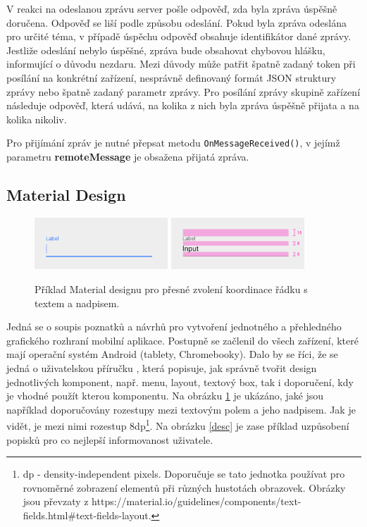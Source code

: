 V reakci na odeslanou zprávu server pošle odpověď, zda byla zpráva úspěšně doručena. Odpověď se liší podle způsobu odeslání. Pokud byla zpráva odeslána pro určité téma, v případě úspěchu odpověď obsahuje identifikátor dané zprávy. Jestliže odeslání nebylo úspěšné, zpráva bude obsahovat chybovou hlášku, informující o důvodu nezdaru. Mezi důvody může patřit špatně zadaný token při posílání na konkrétní zařízení, nesprávně definovaný formát JSON struktury zprávy nebo špatně zadaný parametr zprávy. Pro posílání zprávy skupině zařízení následuje odpověď, která udává, na kolika z nich byla zpráva úspěšně přijata a na kolika nikoliv.

Pro přijímání zpráv je nutné přepsat metodu \texttt{OnMessageReceived()}, v jejímž parametru \textbf{remoteMessage}  je obsažena přijatá zpráva. 

\subsection*{Material Design}

\begin{figure}[H]
\centering
\includegraphics[width= 5cm]{obrazky-figures/label1}
\includegraphics[width= 5cm]{obrazky-figures/label}
\caption{Příklad Material designu pro přesné zvolení koordinace řádku s textem a nadpisem.}
\label{label}
\end{figure}

Jedná se o soupis poznatků a návrhů pro vytvoření jednotného a přehledného grafického rozhraní mobilní aplikace. Postupně se začlenil do všech zařízení, které mají operační systém Android (tablety, Chromebooky). Dalo by se říci, že se jedná o uživatelskou příručku \cite{material}, která popisuje, jak správně tvořit design jednotlivých komponent, např. menu, layout, textový box, tak i doporučení, kdy je vhodné použít kterou komponentu. Na obrázku \ref{label} je ukázáno, jaké jsou například doporučovány rozestupy mezi textovým polem a jeho nadpisem. Jak je vidět, je mezi nimi rozestup 8dp\footnote{dp - density-independent pixels. Doporučuje se tato jednotka používat pro rovnoměrné zobrazení elementů při různých hustotách obrazovek. Obrázky jsou převzaty z https://material.io/guidelines/components/text-fields.html\#text-fields-layout.}. Na obrázku \ref{desc} je zase příklad uzpůsobení popisků pro co nejlepší informovanost uživatele. 

